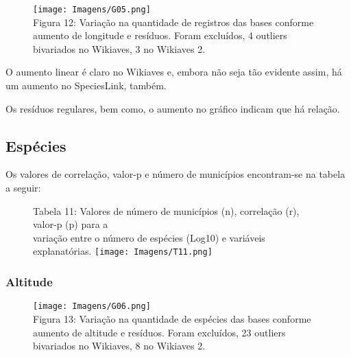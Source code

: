 \documentclass[12pt]{extarticle}
\newenvironment{resposta}{ \color{mygray}}{}
\begin{document}
\begin{figure}[h!]
\centering
\texttt{[image: Imagens/G05.png]}
\\{\scriptsize Figura 12: Variação na quantidade de registros das bases conforme aumento de longitude e resíduos. Foram excluídos, 4 outliers bivariados no Wikiaves, 3 no Wikiaves 2.}
\end{figure}

 \begin{resposta}
O aumento linear é claro no Wikiaves e, embora não seja tão evidente assim, há um aumento no SpeciesLink, também.

Os resíduos regulares, bem como, o aumento no gráfico indicam que há relação.
\end{resposta}


\subsection{Espécies}

\begin{resposta}
Os valores de correlação, valor-p e número de municípios encontram-se na tabela a seguir:
\end{resposta}

\newpage

\begin{figure}[h!]
\centering
{\scriptsize Tabela 11: Valores de número de municípios (n), correlação (r), valor-p (p) para a\\ variação entre o número de espécies (Log10) e variáveis explanatórias.}
\texttt{[image: Imagens/T11.png]}
\end{figure}

\subsubsection{Altitude}


 

\begin{figure}[h!]
\centering
\texttt{[image: Imagens/G06.png]}
\\{\scriptsize Figura 13: Variação na quantidade de espécies das bases conforme aumento de altitude e resíduos. Foram excluídos, 23 outliers bivariados no Wikiaves, 8 no Wikiaves 2.}
\end{figure}
\end{document}
